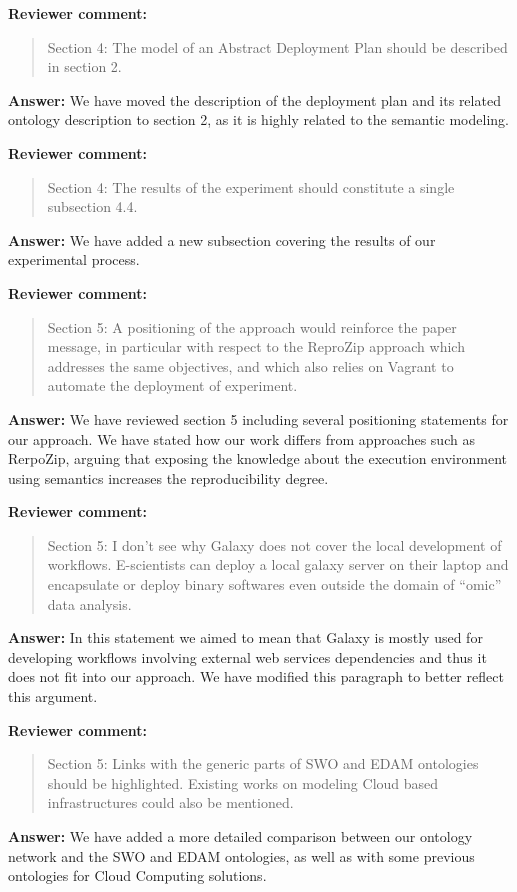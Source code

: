 \documentclass{letter}
\newenvironment{review}%
{\textbf{Reviewer comment:}\begin{quote}}%
{\end{quote}}%
\newcommand{\answer}[1]{%
      \textbf{Answer:} #1}
\begin{document}
\begin{letter}{}
\begin{review}
Section 4: The model of an Abstract Deployment Plan should be described in section 2.
\end{review}

\answer{We have moved the description of the deployment plan and its related ontology description to section 2, as it is highly related to the semantic modeling.}


\begin{review}
Section 4: The results of the experiment should constitute a single subsection 4.4.
\end{review}

\answer{We have added a new subsection covering the results of our experimental process.}


\begin{review}
Section 5: A positioning of the approach would reinforce the paper message, in particular with respect to the ReproZip approach which addresses the same objectives, and which also relies on Vagrant to automate the deployment of experiment.
\end{review}

\answer{We have reviewed section 5 including several positioning statements for our approach. We have stated how our work differs from approaches such as RerpoZip, arguing that exposing the knowledge about the execution environment using semantics increases the reproducibility degree.}


\begin{review}
Section 5: I don't see why Galaxy does not cover the local development of workflows. E-scientists can deploy a local galaxy server on their laptop and encapsulate or deploy binary softwares even outside the domain of ``omic'' data analysis.
\end{review}

\answer{In this statement we aimed to mean that Galaxy is mostly used for developing workflows involving external web services dependencies and thus it does not fit into our approach. We have modified this paragraph to better reflect this argument.}


\begin{review}
Section 5: Links with the generic parts of SWO and EDAM ontologies should be highlighted. Existing works on modeling Cloud based infrastructures could also be mentioned.
\end{review}

\answer{We have added a more detailed comparison between our ontology network and the SWO and EDAM ontologies, as well as with some previous ontologies for Cloud Computing solutions.}




\end{letter}
\end{document}
